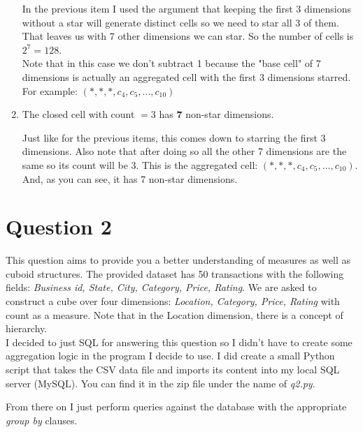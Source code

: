 \documentclass[11pt]{article}
\begin{document}
\begin{enumerate}[label=\alph*.]
In the previous item I used the argument that keeping the first 3 dimensions without a star will generate distinct cells so we need to star all 3 of them. That leaves us with 7 other dimensions we can star. So the number of cells is $2^7 = 128$. \\
Note that in this case we don't subtract 1 because the "base cell" of 7 dimensions is actually an aggregated cell with the first 3 dimensions starred. \\For example: $(*, *, *, c_4, c_5, ..., c_{10})$


\item The closed cell with count $= 3$ has \textbf{7} non-star dimensions.

Just like for the previous items, this comes down to starring the first 3 dimensions. Also note that after doing so all the other 7 dimensions are the same so its count will be 3.
This is the aggregated cell: $(*, *, *, c_4, c_5, ..., c_{10})$. And, as you can see, it has 7 non-star dimensions.

\end{enumerate}

\newpage \nocite{*}

\section*{Question 2}
This question aims to provide you a better understanding of measures as well as cuboid structures. The provided dataset has 50 transactions with the following fields: \textit{Business id, State, City, Category, Price, Rating}. We are asked to construct a cube over four dimensions: \textit{Location, Category, Price, Rating} with count as a measure. Note that in the Location dimension, there is a concept of hierarchy.\\

I decided to just SQL for answering this question so I didn't have to create some aggregation logic in the program I decide to use. I did create a small Python script that takes the CSV data file and imports its content into my local SQL server (MySQL). You can find it in the zip file under the name of \textit{q2.py}. 

From there on I just perform queries against the database with the appropriate \textit{group by} clauses.
\end{document}
